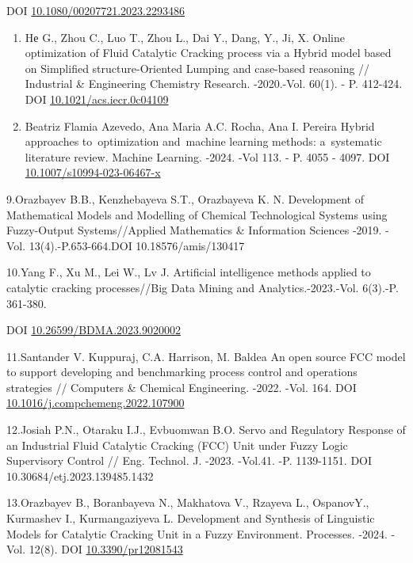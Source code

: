 DOI
\href{https://doi.org/10.1080/00207721.2023.2293486}{10.1080/00207721.2023.2293486}

\begin{enumerate}
\def\labelenumi{\arabic{enumi}.}
\setcounter{enumi}{6}
\item
  Hе G., Zhou C., Luo T., Zhou L., Dai Y., Dang, Y., Ji, X. Online
  optimization of Fluid Catalytic Cracking process via a Hybrid model
  based on Simplified structure-Oriented Lumping and case-based
  reasoning // Industrial \& Engineering Chemistry Research. -2020.-Vol.
  60(1). - P. 412-424. DOI
  \href{http://dx.doi.org/10.1021/acs.iecr.0c04109}{10.1021/acs.iecr.0c04109}
\item
  Beatriz Flamia Azevedo, Ana Maria A.C. Rocha, Ana I. Pereira Hybrid
  approaches to~optimization and~machine learning methods: a~systematic
  literature review. Machine Learning. -2024. -Vol 113. - P. 4055 -
  4097. DOI
  \href{http://dx.doi.org/10.1007/s10994-023-06467-x}{10.1007/s10994-023-06467-x}
\end{enumerate}

9.Orazbayev B.B., Kenzhebayeva S.T., Orazbayeva K. N. Development of
Mathematical Models and Modelling of Chemical Technological Systems
using Fuzzy-Output Systems//Applied Mathematics \& Information Sciences
-2019. -Vol. 13(4).-P.653-664.DOI 10.18576/amis/130417

10.Yang F., Xu M., Lei W., Lv J. Artificial intelligence methods applied
to catalytic cracking processes//Big Data Mining and
Analytics.-2023.-Vol. 6(3).-P. 361-380.

DOI
\href{http://dx.doi.org/10.26599/BDMA.2023.9020002}{10.26599/BDMA.2023.9020002}

11.Santander V. Kuppuraj, C.A. Harrison, M. Baldea An open source FCC
model to support developing and benchmarking process control and
operations strategies // Computers \& Chemical Engineering. -2022. -Vol.
164. DOI
\href{https://doi.org/10.1016/j.compchemeng.2022.107900}{10.1016/j.compchemeng.2022.107900}

12.Josiah P.N., Otaraku I.J., Evbuomwan B.O. Servo and Regulatory
Response of an Industrial Fluid Catalytic Cracking (FCC) Unit under
Fuzzy Logic Supervisory Control // Eng. Technol. J. -2023. -Vol.41. -P.
1139-1151. DOI 10.30684/etj.2023.139485.1432

13.Orazbayev B., Boranbayeva N., Makhatova V., Rzayeva L., OspanovY.,
Kurmashev I., Kurmangaziyeva L. Development and Synthesis of Linguistic
Models for Catalytic Cracking Unit in a Fuzzy Environment. Processes.
-2024. -Vol. 12(8). DOI
\href{https://doi.org/10.3390/pr12081543}{10.3390/pr12081543}

